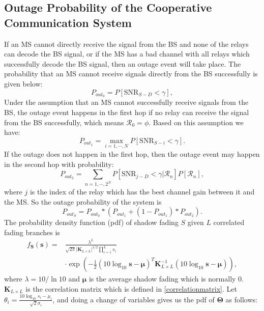 \subsection{Outage Probability of the Cooperative Communication System}
\label{outageprobability}
 If an MS cannot directly receive the signal from the BS and none of the relays can decode the BS signal, or if the MS has a bad channel with all relays which successfully decode the BS signal, then an outage event will take place. The probability that an MS cannot receive signals directly from the BS successfully is given below:
\begin{equation}
P_{out_{0}} = P[\text{SNR}_{S-D}<\gamma],
\end{equation}
Under the assumption that an MS cannot successfully receive signals from the BS, the outage event happens in the first hop if no relay can receive the signal from the BS successfully, which means $\mathcal{R}_{0}=\phi$. Based on this assumption we have:
\begin{equation}
P_{out_{1}} = \max_{i = 1,\cdots,N} P[\text{SNR}_{S-i}<\gamma].
\end{equation}
If the outage does not happen in the first hop, then the outage event may happen in the second hop with probability:
\begin{equation}
P_{out_{2}} = \sum_{n=1,\cdots,2^{N}}P[\text{SNR}_{j-D}<\gamma|\mathcal{R}_{n}]P[\mathcal{R}_{n}],
\end{equation}
where $j$ is the index of the relay which has the best channel gain between it and the MS.
So the outage probability of the system is
\begin{equation}
P_{out_{S}} = P_{out_{0}}*(P_{out_{1}}+(1-P_{out_{1}})*P_{out_{2}}).
\end{equation}
The probability density function (pdf) of shadow fading $S$ given $L$ correlated fading branches is
\begin{equation}
\begin{split}
f_{\mathbf{S}}(\mathbf{s}) = &\frac{\lambda^{L}}{\sqrt{2\pi}|\mathbf{K}_{L\times L}|^{1/2}\prod_{i=1}^{L}s_{i}}\\
&\cdot\exp(-\frac{1}{2}(10\log_{10}\mathbf{s}-\boldsymbol{\mu})^{T}\mathbf{K}_{L\times L}^{-1}(10\log_{10}\mathbf{s}-\boldsymbol{\mu})),
\end{split}
\end{equation}
where $\lambda = 10/\ln10$ and $\boldsymbol{\mu}$ is the average shadow fading which is normally $0$. $\mathbf{K}_{L\times L}$ is the correlation matrix which is defined in \eqref{correlationmatrix}. Let $\theta_{i} = \frac{10\log_{10}s_{i}-\mu_{i}}{\sqrt{2}\sigma_{i}}$, and doing a change of variables gives us the pdf of $\mathbf{\Theta}$ as follows:
